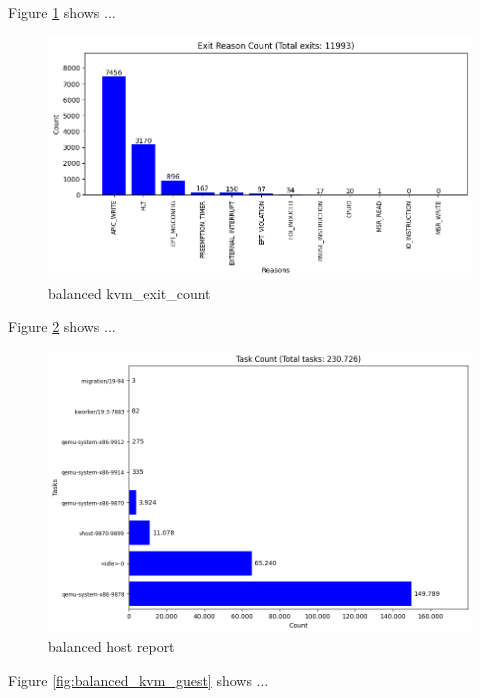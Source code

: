 \documentclass[MMR,Master,english]{twbook}
\begin{document}
Figure \ref{fig:balanced_kvm_exit} shows ...

\begin{figure}[H]
	\centering
	\includegraphics[width=1.0\columnwidth]{img/balanced/kvm_exit_count.png}
	\caption[balanced kvm\_exit\_count]{balanced kvm\_exit\_count}
	\label{fig:balanced_kvm_exit}
\end{figure}
\clearpage

Figure \ref{fig:balanced_kvm_host} shows ...

\begin{figure}[H]
	\centering
	\includegraphics[width=1.0\columnwidth]{img/balanced/results_host_report.png}
	\caption[balanced host report]{balanced host report}
	\label{fig:balanced_kvm_host}
\end{figure}
\clearpage

Figure \ref{fig:balanced_kvm_guest} shows ...
\end{document}
